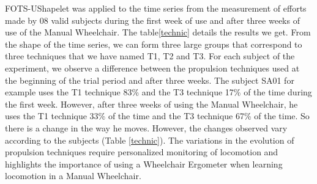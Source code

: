 FOTS-UShapelet was applied to the time series from the measurement of efforts made by 08 valid subjects during the first week of use and after three weeks of use of the Manual Wheelchair. The table\ref{technic} details the results we get. From the shape of the time series, we can form three large groups that correspond to three techniques that we have named T1, T2 and T3. For each subject of the experiment, we observe a difference between the propulsion techniques used at the beginning of the trial period and after three weeks. The subject SA01 for example uses the T1 technique 83\% and the T3 technique 17\% of the time during the first week. However, after three weeks of using the Manual Wheelchair, he uses the T1 technique 33\% of the time and the T3 technique 67\% of the time. So there is a change in the way he moves. 
However, the changes observed vary according to the subjects (Table \ref{technic}). The variations in the evolution of propulsion techniques require personalized monitoring of locomotion and highlights the importance of using a Wheelchair Ergometer when learning locomotion in a Manual Wheelchair.




